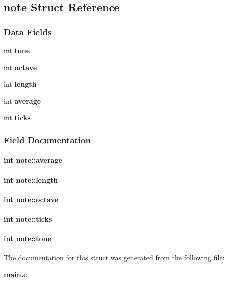 \subsection{note Struct Reference}
\label{structnote}
\subsubsection*{Data Fields}
\begin{DoxyCompactItemize}
\item 
int {\bf tone}
\item 
int {\bf octave}
\item 
int {\bf length}
\item 
int {\bf average}
\item 
int {\bf ticks}
\end{DoxyCompactItemize}


\subsubsection{Field Documentation}
\paragraph[{average}]{\setlength{\rightskip}{0pt plus 5cm}int note\+::average}\label{structnote_aed9fb8ec9c20fa4620f928c988dba840}
\paragraph[{length}]{\setlength{\rightskip}{0pt plus 5cm}int note\+::length}\label{structnote_a348563a2eef21d1187cf04f493fedf36}
\paragraph[{octave}]{\setlength{\rightskip}{0pt plus 5cm}int note\+::octave}\label{structnote_a8b58f133e02c3ea4ec40ee641b654dcf}
\paragraph[{ticks}]{\setlength{\rightskip}{0pt plus 5cm}int note\+::ticks}\label{structnote_a7dd3a334a8a3f52abeb1a4f5822cc05c}
\paragraph[{tone}]{\setlength{\rightskip}{0pt plus 5cm}int note\+::tone}\label{structnote_a30832d96c968d682e5838b39370a1908}


The documentation for this struct was generated from the following file\+:\begin{DoxyCompactItemize}
\item 
{\bf main.\+c}\end{DoxyCompactItemize}
